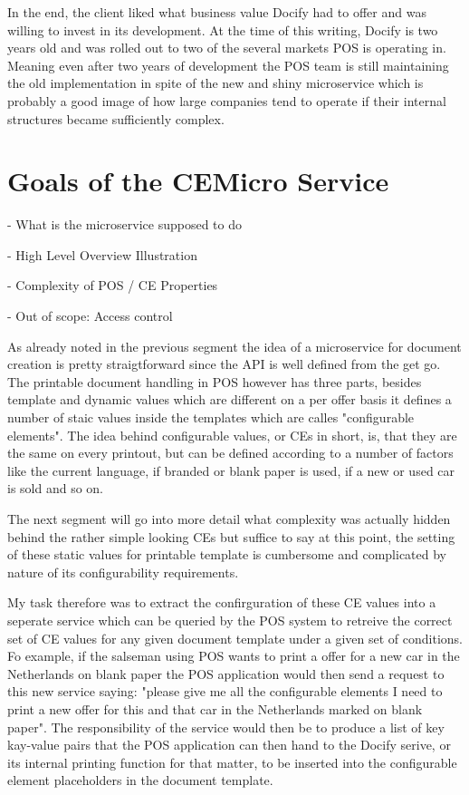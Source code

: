 In the end, the client liked what business value Docify had to offer and was willing to invest in its development. At the time of this writing, Docify is two years old and was rolled out to two of the several markets POS is operating in. Meaning even after two years of development the POS team is still maintaining the old implementation in spite of the new and shiny microservice which is probably a good image of how large companies tend to operate if their internal structures became sufficiently complex.

\section{Goals of the CEMicro Service}

- What is the microservice supposed to do

- High Level Overview Illustration

- Complexity of POS / CE Properties

- Out of scope: Access control


As already noted in the previous segment the idea of a microservice for document creation is pretty straigtforward since the API is well defined from the get go. The printable document handling in POS however has three parts, besides template and dynamic values which are different on a per offer basis it defines a number of staic values inside the templates which are calles "configurable elements". The idea behind configurable values, or CEs in short, is, that they are the same on every printout, but can be defined according to a number of factors like the current language, if branded or blank paper is used, if a new or used car is sold and so on.

The next segment will go into more detail what complexity was actually hidden behind the rather simple looking CEs but suffice to say at this point, the setting of these static values for printable template is cumbersome and complicated by nature of its configurability requirements.

My task therefore was to extract the confirguration of these CE values into a seperate service which can be queried by the POS system to retreive the correct set of CE values for any given document template under a given set of conditions. Fo example, if the salseman using POS wants to print a offer for a new car in the Netherlands on blank paper the POS application would then send a request to this new service saying: "please give me all the configurable elements I need to print a new offer for this and that car in the Netherlands marked on blank paper". The responsibility of the service would then be to produce a list of key kay-value pairs that the POS application can then hand to the Docify serive, or its internal printing function for that matter, to be inserted into the configurable element placeholders in the document template.

